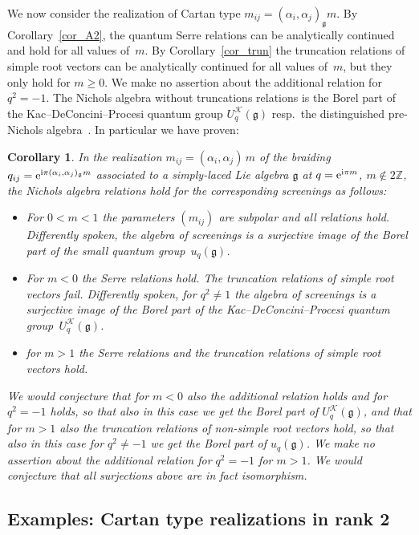 \documentclass[10pt,a4paper]{amsart}
\numberwithin{equation}{section}
\newtheorem{cor}[teo]{Corollary}
\newcommand{\Z}{\mathbb{Z}}
\renewcommand{\i}{\mathrm{i}}
\newcommand{\g}{\mathfrak{g}}
\begin{document}
We now consider the realization of Cartan type $m_{ij}=(\alpha_i,\alpha_j)_\g m$. By Corollary~\ref{cor_A2}, the quantum Serre relations can be analytically continued and hold for all values of~$m$. By Corollary~\ref{cor_trun} the truncation relations of simple root vectors can be analytically continued for all values of~$m$, but they only hold for $m\geq 0$. We make no assertion about the additional relation for $q^2=-1$. The Nichols algebra without truncations relations is the Borel part of the Kac--DeConcini--Procesi quantum group $U_q^\mathcal{K}(\g)$ resp.~the distinguished pre-Nichols algebra~\cite{Ang16}. In particular we have proven:
\begin{cor}In the realization $m_{ij}=(\alpha_i,\alpha_j)\,m$ of the braiding $q_{ij}={\rm e}^{\i\pi(\alpha_i,\alpha_j)_\g m}$ associated to a simply-laced Lie algebra $\g$ at $q={\rm e}^{{\rm i}\pi m}$, $m\not\in 2\Z$, the Nichols algebra relations hold for the corresponding screenings as follows:
	\begin{itemize}\itemsep=0pt
		\item For $0<m<1$ the parameters $(m_{ij})$ are subpolar and all relations hold. Differently spoken, the algebra of screenings is a surjective image of the Borel part of the small quantum group~$u_q(\g)$.
		\item For $m<0$ the Serre relations hold. The truncation relations of simple root vectors fail. Differently spoken, for $q^2\neq 1$ the algebra of screenings is a surjective image of the Borel part of the Kac--DeConcini--Procesi quantum group~$U_q^\mathcal{K}(\g)$.
		\item for $m>1$ the Serre relations and the truncation relations of simple root vectors hold.
	\end{itemize}
We would conjecture that for $m<0$ also the additional relation holds and for $q^2=-1$ holds, so that also in this case we get the Borel part of $U_q^\mathcal{K}(\g)$, and that for $m>1$ also the truncation relations of non-simple root vectors hold, so that also in this case for $q^2\neq -1$ we get the Borel part of $u_q(\g)$. We make no assertion about the additional relation for $q^2=-1$ for $m>1$.
	We would conjecture that all surjections above are in fact isomorphism.
\end{cor}

\subsection{Examples: Cartan type realizations in rank 2}
\end{document}
